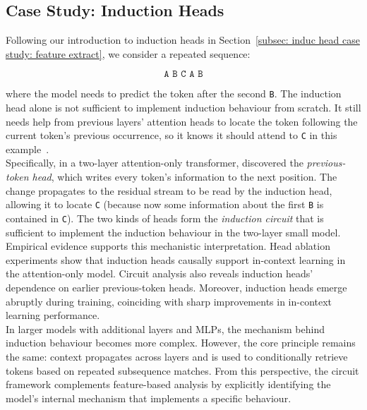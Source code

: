 \subsection{Case Study: Induction Heads}
\label{subsec: induc head case study: circuit}
\begin{examplebox}

Following our introduction to induction heads in Section~\ref{subsec: induc head case study: feature extract}, we consider a repeated sequence:

\[
\texttt{A B C A B}
\]

where the model needs to predict the token after the second \texttt{B}. The induction head alone is not sufficient to implement induction behaviour from scratch. It still needs help from previous layers’ attention heads to locate the token following the current token's previous occurrence, so it knows it should attend to \texttt{C} in this example~.\\

Specifically, in a two-layer attention-only transformer,  discovered the \emph{previous-token head}, which writes every token’s information to the next position. The change propagates to the residual stream to be read by the induction head, allowing it to locate \texttt{C} (because now some information about the first \texttt{B} is contained in \texttt{C}). The two kinds of heads form the \emph{induction circuit} that is sufficient to implement the induction behaviour in the two-layer small model.\\

Empirical evidence supports this mechanistic interpretation. Head ablation experiments show that induction heads causally support in-context learning in the attention-only model. Circuit analysis also reveals induction heads’ dependence on earlier previous-token heads. Moreover, induction heads emerge abruptly during training, coinciding with sharp improvements in in-context learning performance.\\

In larger models with additional layers and MLPs, the mechanism behind induction behaviour becomes more complex. However, the core principle remains the same: context propagates across layers and is used to conditionally retrieve tokens based on repeated subsequence matches. From this perspective, the circuit framework complements feature-based analysis by explicitly identifying the model’s internal mechanism that implements a specific behaviour.
\end{examplebox}

